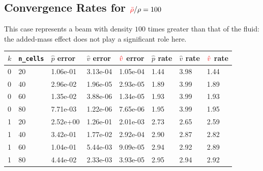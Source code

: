 \documentclass[
paperwidth=48in,paperheight=36in,
fontscale=0.4
]{baposter}
\begin{document}
\begin{poster}
{\subsection{Convergence Rates for \({\color{red} \bar{\rho}}/\rho = 100\)}
    This case represents a beam with density \(100\) times greater than that
    of the fluid: the added-mass effect does not play a significant role
    here.
    \begin{center}
        \begin{tabular}{| l | l | l | l | l | l | l | l |}
            \hline
            \(k\) & \texttt{n\_cells} &
            \(\hat{p}\) error & \(\hat{v}\) error & \({\color{red} \hat{v}}\) error &
            \(\hat{p}\) rate & \(\hat{v}\) rate & \({\color{red} \hat{v}}\) rate    \\
            \hline
            0 & 20 & 1.06e-01 & 3.13e-04 & 1.05e-04 & 1.44 & 3.98 & 1.44      \\
            0 & 40 & 2.96e-02 & 1.96e-05 & 2.93e-05 & 1.89 & 3.99 & 1.89      \\
            0 & 60 & 1.35e-02 & 3.88e-06 & 1.34e-05 & 1.93 & 3.99 & 1.93      \\
            0 & 80 & 7.71e-03 & 1.22e-06 & 7.65e-06 & 1.95 & 3.99 & 1.95      \\
            \hline
            1 & 20 & 2.52e+00 & 1.26e-01 & 2.01e-03 & 2.73 & 2.65 & 2.59      \\
            1 & 40 & 3.42e-01 & 1.77e-02 & 2.92e-04 & 2.90 & 2.87 & 2.82      \\
            1 & 60 & 1.04e-01 & 5.44e-03 & 9.09e-05 & 2.94 & 2.92 & 2.89      \\
            1 & 80 & 4.44e-02 & 2.33e-03 & 3.93e-05 & 2.95 & 2.94 & 2.92      \\
            \hline
        \end{tabular}
    \end{center}

}
\end{poster}
\end{document}
